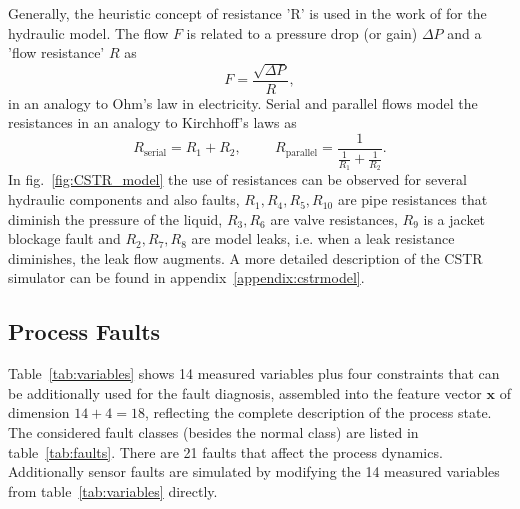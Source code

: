 \documentclass[10pt, conference, compsocconf]{IEEEtran}
\newcommand{\xx}{{\mathbf{x}}}
\newcommand{\reffig}[1]{fig.~\ref{fig:#1}}
\newcommand{\reftab}[1]{table~\ref{tab:#1}}
\newcommand{\refTab}[1]{Table~\ref{tab:#1}}
\newcommand{\refappendix}[1]{appendix~\ref{appendix:#1}}
\begin{document}
Generally, the heuristic concept of resistance 'R' is used in
the work of \cite{phdthesisFinch1989} for the hydraulic model.
The flow $F$ is related to a pressure drop (or gain) $\Delta P$
and a 'flow resistance' $R$ as
\begin{equation}
F = \frac{\sqrt{\Delta P}}{R},
\label{eq:relationFlowPressure}
\end{equation}
in an analogy to Ohm's law in electricity.
Serial and parallel flows model
the resistances in an analogy to Kirchhoff's laws
as
\begin{equation}
R_{\text{serial}} = R_{1}+R_{2},\hspace{1cm}
	R_{\text{parallel}}=\frac{1}{\frac{1}{R_{1}}+\frac{1}{R_{2}}}.
\label{eq:resistancelaws}
\end{equation}
In \reffig{CSTR_model} the use of resistances can be observed for
several hydraulic components and also faults,
$R_{1},R_{4},R_{5},R_{10}$ are pipe
resistances that diminish the pressure of the liquid, $R_{3},R_{6}$
are valve resistances, $R_{9}$ is a jacket blockage fault
and $R_{2},R_{7},R_{8}$ are model leaks,
i.e. when a leak resistance diminishes, the leak flow augments.
A more detailed description of the CSTR simulator can be
found in \refappendix{cstrmodel}.




\subsection{Process Faults}\label{sec:CSTRfaults}




\refTab{variables} shows 14 measured variables plus four constraints
that can be additionally used for the fault diagnosis,
assembled into the feature vector $\xx$ of dimension $14+4=18$,
reflecting the complete description of the process state.
The considered fault classes (besides the normal class)
are listed in \reftab{faults}. There are 21 faults that affect
the process dynamics. Additionally sensor faults are simulated
by modifying the 14 measured variables from \reftab{variables} directly.
\end{document}
